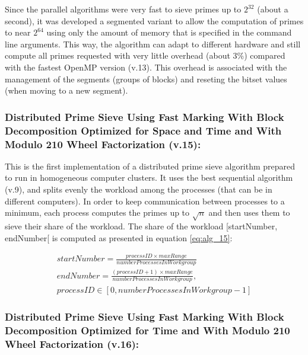 \documentclass[runningheads,a4paper]{llncs}
\begin{document}
Since the parallel algorithms were very fast to sieve primes up to $2^{32}$ (about a second), it was developed a segmented variant to allow the computation of primes to near $2^{64}$ using only the amount of memory that is specified in the command line arguments. This way, the algorithm can adapt to different hardware and still compute all primes requested with very little overhead (about 3\%) compared with the fastest OpenMP version (v.13). This overhead is associated with the management of the segments (groups of blocks) and reseting the bitset values (when moving to a new segment).


\subsubsection{Distributed Prime Sieve Using Fast Marking With Block Decomposition Optimized for Space and Time and With Modulo 210 Wheel Factorization (v.15):}
\label{Distributed Prime Sieve Using Fast Marking With Block Decomposition Optimized for Space and Time and With Modulo 210 Wheel Factorization}

This is the first implementation of a distributed prime sieve algorithm prepared to run in homogeneous computer clusters.
It uses the best sequential algorithm (v.9), and splits evenly the workload among the processes (that can be in different computers).
In order to keep communication between processes to a minimum, each process computes the primes up to $\sqrt{n}$ and then uses them to sieve their share of the workload.
The share of the workload [startNumber, endNumber[ is computed as presented in equation \ref{eq:alg_15}:

\begin{equation}
        \begin{split}
                startNumber = \frac{processID \times maxRange}{numberProcessesInWorkgroup}       \\
                endNumber = \frac{(processID + 1) \times maxRange}{numberProcessesInWorkgroup}, \\      processID \in [0, numberProcessesInWorkgroup - 1]
        \end{split}
        \label{eq:alg_15}
\end{equation}


\subsubsection{Distributed Prime Sieve Using Fast Marking With Block Decomposition Optimized for Time and With Modulo 210 Wheel Factorization (v.16):}
\label{Distributed Prime Sieve Using Fast Marking With Block Decomposition Optimized for Time and With Modulo 210 Wheel Factorization}
\end{document}
